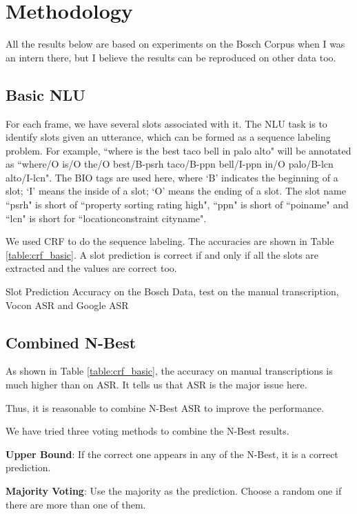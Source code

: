 \documentclass[11pt,letterpaper]{article}
\begin{document}
\section{Methodology}
All the results below are based on experiments on the Bosch Corpus when I was an intern there, but I believe the results can be reproduced on other data too.
\subsection{Basic NLU}
For each frame, we have several slots associated with it. The NLU task is to identify slots given an utterance, which can be formed as a sequence labeling problem. For example, ``where is the best taco bell in palo alto" will be annotated as ``where/O is/O the/O best/B-psrh taco/B-ppn bell/I-ppn in/O palo/B-lcn alto/I-lcn". The BIO tags are used here, where `B' indicates the beginning of a slot; `I' means the inside of a slot; `O' means the ending of a slot. The slot name ``psrh" is short of ``property sorting rating high", ``ppn" is short of ``poiname" and ``lcn" is short for ``locationconstraint cityname".

We used CRF \cite{Lafferty:2001} to do the sequence labeling. The accuracies are shown in Table \ref{table:crf_basic}. A slot prediction is correct if and only if all the slots are extracted and the values are correct too.

\begin{table}[!htb] 
\centering 
 
\caption{Slot Prediction Accuracy on the Bosch Data, test on the manual transcription, Vocon ASR and Google ASR} 
\label{table:crf_basic} 
\end{table} 

\subsection{Combined N-Best}
As shown in Table \ref{table:crf_basic}, the accuracy on manual transcriptions is much higher than on ASR. It tells us that ASR is the major issue here.

Thus, it is reasonable to combine N-Best ASR to improve the performance.

We have tried three voting methods to combine the N-Best results.
 
{\bf Upper Bound}: 
If the correct one appears in any of the N-Best, it is a correct prediction. 
 
{\bf Majority Voting}: 
Use the majority as the prediction. Choose a random one if there are more than one of them. 
 
\end{document}
